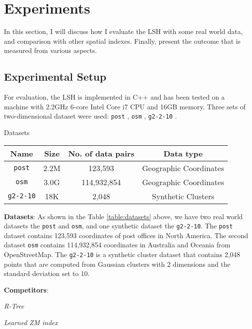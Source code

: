 \chapter{Experiments}
In this section, I will discuss how I evaluate the LSH with some real world data, and comparison with other spatial indexes. Finally, present the outcome that is measured from various aspects.

\section{Experimental Setup}

For evaluation, the LSH is implemented in C++ and has been tested on a machine with 2.2GHz 6-core Intel Core i7 CPU and 16GB memory. Three sets of two-dimensional dataset were used: \texttt{post} \cite{rtreeportal}, \texttt{osm} \cite{OpenStreetMap}, \texttt{g2-2-10} \cite{G2sets}. 

\begin{center}
\begin{adjustbox}{max width={\textwidth}, max totalheight={\textheight},keepaspectratio}
\begin{threeparttable}
\caption{Datasets}

\begin{tabular}{c|c c c}
    \toprule
    \textbf{Name}    &\textbf{Size}  & \textbf{No. of data pairs} & \textbf{Data type}             \\ \midrule 
    \texttt{post}    & 2.2M & 123,593             &Geographic Coordinates \\
    \texttt{osm}     & 3.0G & 114,932,854         &Geographic Coordinates \\
    \texttt{g2-2-10} & 18K  & 2,048               & Synthetic Clusters    \\ \bottomrule
\end{tabular}

\end{threeparttable}
\label{table:datasets}
\end{adjustbox}
\end{center}

\textbf{Datasets}: As shown in the Table \ref{table:datasets} above, we have two real world datasets the \texttt{post} and \texttt{osm}, and one synthetic dataset the \texttt{g2-2-10}. The \texttt{post} dataset contains 123,593 coordinates of post offices in North America. The second dataset \texttt{osm} contains 114,932,854 coordinates in Australia and Oceania from OpenStreetMap. The \texttt{g2-2-10} is a synthetic cluster dataset that contains 2,048 points that are computed from Gaussian clusters with 2 dimensions and the standard deviation set to 10. 



\textbf{Competitors}:

\textit{R-Tree}


\textit{Learned ZM index}
